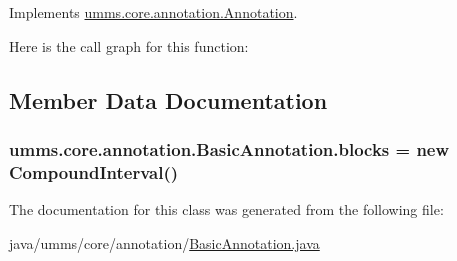 Implements \hyperlink{interfaceumms_1_1core_1_1annotation_1_1_annotation_acce146fb7b3d2613874d376b4b087505}{umms.\+core.\+annotation.\+Annotation}.



Here is the call graph for this function\+:




\subsection{Member Data Documentation}
\hypertarget{classumms_1_1core_1_1annotation_1_1_basic_annotation_a8d54dfeeeaf679fd40a2c3bb5a2db3e0}{
\subsubsection[{blocks}]{ umms.\+core.\+annotation.\+Basic\+Annotation.\+blocks = new {\bf Compound\+Interval}()\hspace{0.3cm}{\ttfamily [protected]}}}\label{classumms_1_1core_1_1annotation_1_1_basic_annotation_a8d54dfeeeaf679fd40a2c3bb5a2db3e0}


The documentation for this class was generated from the following file\+:\begin{DoxyCompactItemize}
\item 
java/umms/core/annotation/\hyperlink{_basic_annotation_8java}{Basic\+Annotation.\+java}\end{DoxyCompactItemize}
